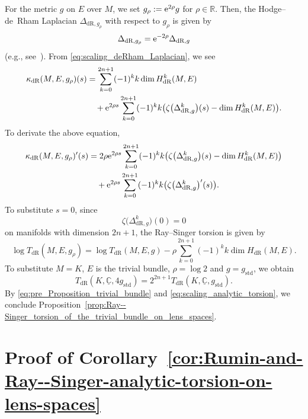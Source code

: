 \documentclass[10pt,a4paper]{amsart}
\numberwithin{equation}{section}
\newcommand{\deRham}{\mathrm{dR}}
\begin{document}
For the metric $g$ on $E$ over $M$,
we set $g_{\rho} := {\rm e}^{2 \rho} g$ for $\rho \in \mathbb{R}$.
Then, the Hodge--de~Rham Laplacian $\Delta_{\deRham , g_{\rho}}$ with respect to $g_{\rho}$
is given by
\begin{equation}
 \Delta_{\deRham , g_{\rho}} = {\rm e}^{ -2 \rho } \Delta_{\deRham , g}
 \label{eq:scaling_deRham_Laplacian}
\end{equation}
(e.g., see~\cite[equation~(5.4)]{Rosenberg-97}).
From \eqref{eq:scaling_deRham_Laplacian}, we see
\begin{align*}
 \kappa_{\deRham} (M, E , g_{\rho} ) (s)
 &{}=
 \sum_{k=0}^{2n+1} (-1)^k k \dim H_{\deRham}^k (M, E)
 \\
 &\quad{}+ {\rm e}^{2 \rho s }
 \sum_{k=0}^{2n+1} (-1)^k k \big(
 \zeta \big(\Delta_{\deRham , g}^k \big) (s )
 -
 \dim H_{\deRham}^k (M, E)
 \big)
 .
\end{align*}
To derivate the above equation,
\begin{align*}
 \kappa_{\deRham} (M, E , g_{\rho} ) ' (s)
 & =
 2 \rho {\rm e}^{2 \rho s }
 \sum_{k=0}^{2n+1} (-1)^k k \big(
 \zeta \big(\Delta_{\deRham , g}^k \big) (s )
 -
 \dim H_{\deRham}^k (M, E)
 \big)
 \\
 & \quad
 + {\rm e}^{2 \rho s }
 \sum_{k=0}^{2n+1} (-1)^k k \big(
 \zeta \big(\Delta_{\deRham , g}^k \big) ' (s )
 \big)
 .
\end{align*}
To substitute $s = 0$,
since
\[
\zeta \big(\Delta_{\deRham , g}^k \big) (0 ) = 0
\]
on manifolds with dimension $2n+1$,
the Ray--Singer torsion is given by
\begin{equation}
 \log T_{\deRham} (M, E , g_{\rho})
 =
 \log T_{\deRham} (M, E , g)
 - \rho \sum_{k = 0 }^{2n+1} (-1)^k k \dim H_{\deRham} (M, E)
 .
 \label{eq:scaling_analytic_torsion_2}
\end{equation}
To substitute $M = K$, $E$ is the trivial bundle, $\rho = \log 2 $ and $g = g_{\mathrm{std}}$,
we obtain
\begin{equation}
 T_{\deRham} (K, \underline{\mathbb{C}} , 4 g_{\mathrm{std}})
 = 2^{2n+1} T_{\deRham} (K, \underline{\mathbb{C}} , g_{\mathrm{std}}) .
 \label{eq:scaling_analytic_torsion}
\end{equation}
By \eqref{eq:pre_Proposition_trivial_bundle} and \eqref{eq:scaling_analytic_torsion},
we conclude Proposition~\ref{prop:Ray--Singer_torsion_of_the_trivial_bundle_on_lens_spaces}.

\section{Proof of Corollary~\ref{cor:Rumin-and-Ray--Singer-analytic-torsion-on-lens-spaces}}
\label{sec:Ray--Singer_torsion_and_contact_analytic_torsion}
\end{document}
